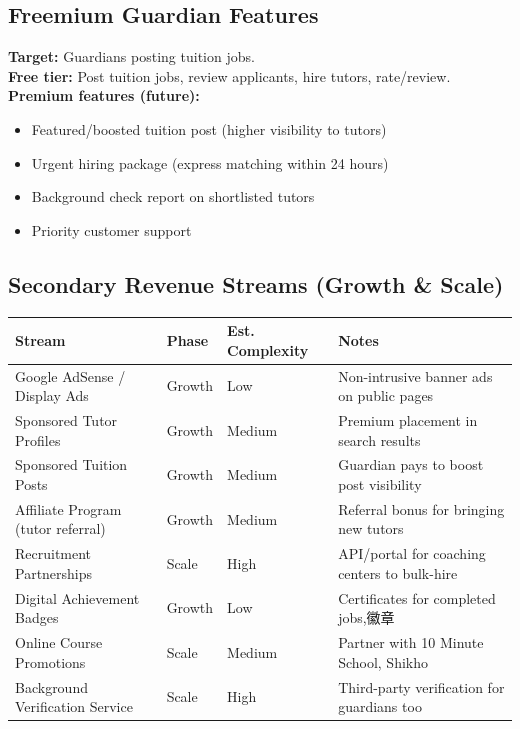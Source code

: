 \documentclass[12pt,a4paper,twoside]{report}
\begin{document}
\subsection{Freemium Guardian Features}

\textbf{Target:} Guardians posting tuition jobs. \\
\textbf{Free tier:} Post tuition jobs, review applicants, hire tutors, rate/review. \\
\textbf{Premium features (future):}
\begin{itemize}
    \item Featured/boosted tuition post (higher visibility to tutors)
    \item Urgent hiring package (express matching within 24 hours)
    \item Background check report on shortlisted tutors
    \item Priority customer support
\end{itemize}

\subsection{Secondary Revenue Streams (Growth \& Scale)}

\begin{longtable}{p{3.5cm}|p{2.5cm}|p{2.5cm}|p{4.5cm}}
\toprule
\textbf{Stream} & \textbf{Phase} & \textbf{Est. Complexity} & \textbf{Notes} \\
\midrule
\endhead
\bottomrule
\endfoot
Google AdSense / Display Ads    & Growth   & Low    & Non-intrusive banner ads on public pages \\
Sponsored Tutor Profiles        & Growth   & Medium & Premium placement in search results \\
Sponsored Tuition Posts         & Growth   & Medium & Guardian pays to boost post visibility \\
Affiliate Program (tutor referral) & Growth & Medium & Referral bonus for bringing new tutors \\
Recruitment Partnerships        & Scale    & High   & API/portal for coaching centers to bulk-hire \\
Digital Achievement Badges      & Growth   & Low    & Certificates for completed jobs,徽章 \\
Online Course Promotions        & Scale    & Medium & Partner with 10 Minute School, Shikho \\
Background Verification Service & Scale    & High   & Third-party verification for guardians too \\
\bottomrule
\end{longtable}
\end{document}
